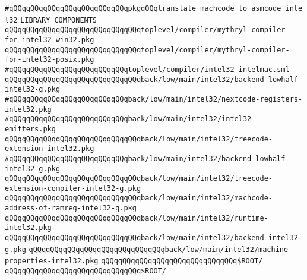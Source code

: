 \verb|#qQQqqQQqqQQqqQQqqQQqqQQqqQQqpkgqQQqtranslate_machcode_to_asmcode_intel32|\newline
\newline
\newline
\newline
\verb|LIBRARY_COMPONENTS|\newline
\newline
\verb|qQQqqQQqqQQqqQQqqQQqqQQqqQQqqQQqtoplevel/compiler/mythryl-compiler-for-intel32-win32.pkg|\newline
\verb|qQQqqQQqqQQqqQQqqQQqqQQqqQQqqQQqtoplevel/compiler/mythryl-compiler-for-intel32-posix.pkg|\newline
\newline
\verb|#qQQqqQQqqQQqqQQqqQQqqQQqqQQqtoplevel/compiler/intel32-intelmac.sml|\newline
\newline
\newline
\verb|qQQqqQQqqQQqqQQqqQQqqQQqqQQqqQQqback/low/main/intel32/backend-lowhalf-intel32-g.pkg|\newline
\verb|#qQQqqQQqqQQqqQQqqQQqqQQqqQQqback/low/main/intel32/nextcode-registers-intel32.pkg|\newline
\verb|#qQQqqQQqqQQqqQQqqQQqqQQqqQQqback/low/main/intel32/intel32-emitters.pkg|\newline
\verb|qQQqqQQqqQQqqQQqqQQqqQQqqQQqqQQqback/low/main/intel32/treecode-extension-intel32.pkg|\newline
\verb|#qQQqqQQqqQQqqQQqqQQqqQQqqQQqback/low/main/intel32/backend-lowhalf-intel32-g.pkg|\newline
\verb|qQQqqQQqqQQqqQQqqQQqqQQqqQQqqQQqback/low/main/intel32/treecode-extension-compiler-intel32-g.pkg|\newline
\verb|qQQqqQQqqQQqqQQqqQQqqQQqqQQqqQQqback/low/main/intel32/machcode-address-of-ramreg-intel32-g.pkg|\newline
\verb|qQQqqQQqqQQqqQQqqQQqqQQqqQQqqQQqback/low/main/intel32/runtime-intel32.pkg|\newline
\verb|qQQqqQQqqQQqqQQqqQQqqQQqqQQqqQQqback/low/main/intel32/backend-intel32-g.pkg|\newline
\verb|qQQqqQQqqQQqqQQqqQQqqQQqqQQqqQQqback/low/main/intel32/machine-properties-intel32.pkg|\newline
\newline
\verb|qQQqqQQqqQQqqQQqqQQqqQQqqQQqqQQq$ROOT/|\newline
\newline
\verb|qQQqqQQqqQQqqQQqqQQqqQQqqQQqqQQq$ROOT/|\newline
